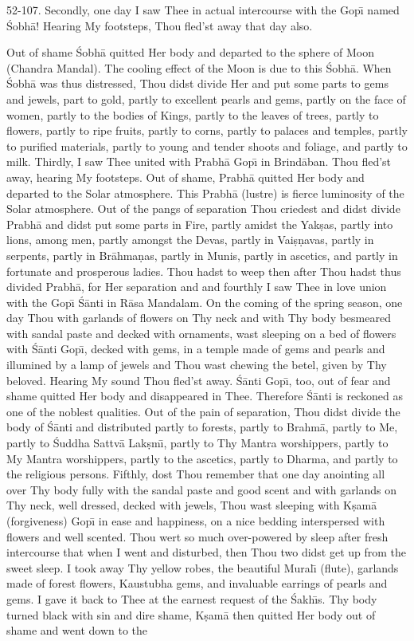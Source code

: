 52-107. Secondly, one day I saw Thee in actual intercourse with the Gop\={\i} named \'Sobh\=a! Hearing My footsteps, Thou fled'st away that day also.

Out of shame \'Sobh\=a quitted Her body and departed to the sphere of Moon (Chandra Mandal). The cooling effect of the Moon is due to this \'Sobh\=a. When \'Sobh\=a was thus distressed, Thou didst divide Her and put some parts to gems and jewels, part to gold, partly to excellent pearls and gems, partly on the face of women, partly to the bodies of Kings, partly to the leaves of trees, partly to flowers, partly to ripe fruits, partly to corns, partly to palaces and temples, partly to purified materials, partly to young and tender shoots and foliage, and partly to milk. Thirdly, I saw Thee united with Prabh\=a Gop\={\i} in Brind\=aban. Thou fled'st away, hearing My footsteps. Out of shame, Prabh\=a quitted Her body and departed to the Solar atmosphere. This Prabh\=a (lustre) is fierce luminosity of the Solar atmosphere. Out of the pangs of separation Thou criedest and didst divide Prabh\=a and didst put some parts in Fire, partly amidst the Yak\d{s}as, partly into lions, among men, partly amongst the Devas, partly in Vai\d{s}\d{n}avas, partly in serpents, partly in Br\=ahma\d{n}as, partly in Munis, partly in ascetics, and partly in fortunate and prosperous ladies. Thou hadst to weep then after Thou hadst thus divided Prabh\=a, for Her separation and and fourthly I saw Thee in love union with the Gop\={\i} \'S\=anti in R\=asa Mandalam. On the coming of the spring season, one day Thou with garlands of flowers on Thy neck and with Thy body besmeared with sandal paste and decked with ornaments, wast sleeping on a bed of flowers with \'S\=anti Gop\={\i}, decked with gems, in a temple made of gems and pearls and illumined by a lamp of jewels and Thou wast chewing the betel, given by Thy beloved. Hearing My sound Thou fled'st away. \'S\=anti Gop\={\i}, too, out of fear and shame quitted Her body and disappeared in Thee. Therefore \'S\=anti is reckoned as one of the noblest qualities. Out of the pain of separation, Thou didst divide the body of \'S\=anti and distributed partly to forests, partly to Brahm\=a, partly to Me, partly to \'Suddha Sattv\=a Lak\d{s}m\={\i}, partly to Thy Mantra worshippers, partly to My Mantra worshippers, partly to the ascetics, partly to Dharma, and partly to the religious persons. Fifthly, dost Thou remember that one day anointing all over Thy body fully with the sandal paste and good scent and with garlands on Thy neck, well dressed, decked with jewels, Thou wast sleeping with K\d{s}am\=a (forgiveness) Gop\={\i} in ease and happiness, on a nice bedding interspersed with flowers and well scented. Thou wert so much over-powered by sleep after fresh intercourse that when I went and disturbed, then Thou two didst get up from the sweet sleep. I took away Thy yellow robes, the beautiful Mural\={\i} (flute), garlands made of forest flowers, Kaustubha gems, and invaluable earrings of pearls and gems. I gave it back to Thee at the earnest request of the \'Sakh\={\i}s. Thy body turned black with sin and dire shame, K\d{s}am\=a then quitted Her body out of shame and went down to the

